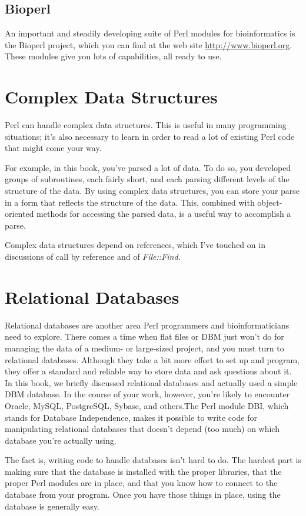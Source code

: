 \subsection{Bioperl}
An important and steadily developing suite of Perl modules for bioinformatics is the Bioperl project, which you can find at the web site \href{http://www.bioperl.org}{http://www.bioperl.org}. These modules give you lots of capabilities, all ready to use. 

\section{Complex Data Structures}
Perl can handle complex data structures. This is useful in many programming situations; it's also necessary to learn in order to read a lot of existing Perl code that might come your way.

For example, in this book, you've parsed a lot of data. To do so, you developed groups of subroutines, each fairly short, and each parsing different levels of the structure of the data. By using complex data structures, you can store your parse in a form that reflects the structure of the data. This, combined with object-oriented methods for accessing the parsed data, is a useful way to accomplish a parse.

Complex data structures depend on references, which I've touched on in discussions of call by reference and of \textit{File::Find}.

\section{Relational Databases}
Relational databases are another area Perl programmers and bioinformaticians need to explore. There comes a time when flat files or DBM just won't do for managing the data of a medium- or large-sized project, and you must turn to relational databases. Although they take a bit more effort to set up and program, they offer a standard and reliable way to store data and ask questions about it. In this book, we briefly discussed relational databases and actually used a simple DBM database. In the course of your work, however, you're likely to encounter Oracle, MySQL, PostgreSQL, Sybase, and others.The Perl module DBI, which stands for Database Independence, makes it possible to write code for manipulating relational databases that doesn't depend (too much) on which database you're actually using.

The fact is, writing code to handle databases isn't hard to do. The hardest part is making sure that the database is installed with the proper libraries, that the proper Perl modules are in place, and that you know how to connect to the database from your program. Once you have those things in place, using the database is generally easy.  

